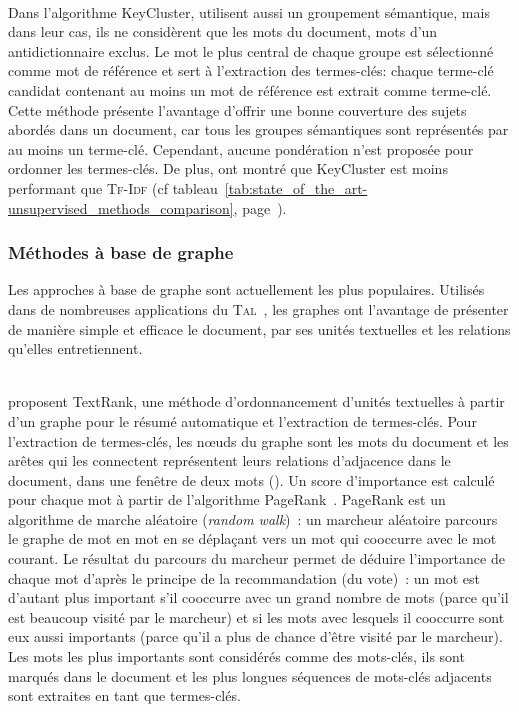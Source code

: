         ~\\Dans l'algorithme KeyCluster,  utilisent
        aussi un groupement sémantique, mais dans leur cas, ils ne considèrent
        que les mots du document, mots d'un antidictionnaire exclus. Le mot le
        plus central de chaque groupe est sélectionné comme mot de référence et
        sert à l'extraction des termes-clés: chaque terme-clé candidat contenant
        au moins un mot de référence est extrait comme terme-clé. Cette méthode
        présente l'avantage d'offrir une bonne couverture des sujets abordés
        dans un document, car tous les groupes sémantiques sont représentés par
        au moins un terme-clé. Cependant, aucune pondération n'est proposée pour
        ordonner les termes-clés. De plus,  ont
        montré que KeyCluster est moins performant que \textsc{Tf-Idf}
        (cf tableau~\ref{tab:state_of_the_art-unsupervised_methods_comparison},
        page~\pageref{tab:state_of_the_art-unsupervised_methods_comparison}).

      \subsubsection{Méthodes à base de graphe}
      \label{subsubsec:main-state_of_the_art-automatic_keyphrase_extraction-unsupervised_keyphrase_extraction-graph_based_approaches}
        Les approches à base de graphe sont actuellement les plus populaires.
        Utilisés dans de nombreuses applications du
        \textsc{Tal}~\cite{kozareva2013textgraphs}, les graphes ont l'avantage
        de présenter de manière simple et efficace le document, par ses unités
        textuelles et les relations qu'elles entretiennent.

        ~\\ proposent TextRank, une méthode
        d'ordonnancement d'unités textuelles à partir d'un graphe pour le résumé
        automatique et l'extraction de termes-clés. Pour l'extraction de
        termes-clés, les n\oe{}uds du graphe sont les mots du document et les
        arêtes qui les connectent représentent leurs relations d'adjacence dans
        le document, dans une fenêtre de deux mots (). Un score
        d'importance est calculé pour chaque mot à partir de l'algorithme
        PageRank~\cite{brin1998pagerank}. PageRank est un algorithme de marche
        aléatoire (\textit{random walk})~: un marcheur aléatoire parcours le
        graphe de mot en mot en se déplaçant vers un mot qui cooccurre avec le
        mot courant. Le résultat du parcours du marcheur permet de déduire
        l'importance de chaque mot d'après le principe de la recommandation (du
        vote)~:  un mot est d'autant plus important s'il cooccurre avec un grand
        nombre de mots (parce qu'il est beaucoup visité par le marcheur) et si
        les mots avec lesquels il cooccurre sont eux aussi importants (parce
        qu'il a plus de chance d'être visité par le marcheur). Les mots les plus
        importants sont considérés comme des mots-clés, ils sont marqués dans le
        document et les plus longues séquences de mots-clés adjacents sont
        extraites en tant que termes-clés.
      
